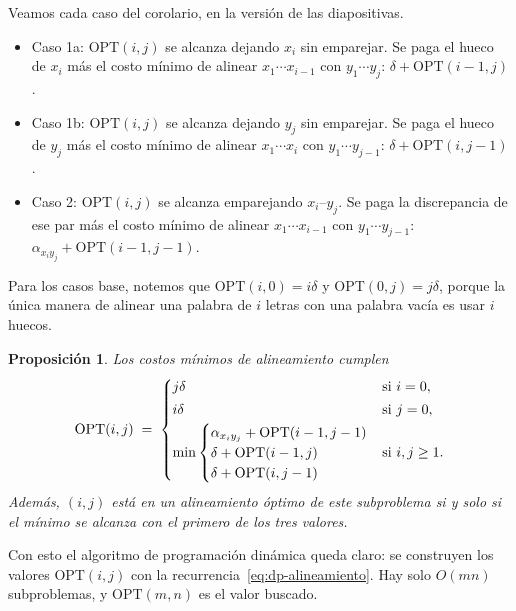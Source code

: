 \documentclass[12pt, spanish, oneside, openany]{book}
\theoremstyle{uprightplain}
\newtheorem{proposicion}[teorema]{Proposición}
\theoremstyle{definition}
\theoremstyle{remark}
\theoremstyle{definition}
\newcommand{\OPT}{\mathrm{OPT}} %
\begin{document}
Veamos cada caso del corolario, en la versión de las diapositivas.
\begin{itemize}
    \item Caso 1a: $\OPT(i,j)$ se alcanza dejando $x_i$ sin emparejar. Se paga el hueco de $x_i$ más el costo mínimo de alinear $x_1\cdots x_{i-1}$ con $y_1\cdots y_j$: $\delta+\OPT(i-1,j)$.
    \item Caso 1b: $\OPT(i,j)$ se alcanza dejando $y_j$ sin emparejar. Se paga el hueco de $y_j$ más el costo mínimo de alinear $x_1\cdots x_i$ con $y_1\cdots y_{j-1}$: $\delta+\OPT(i,j-1)$.
    \item Caso 2: $\OPT(i,j)$ se alcanza emparejando $x_i$--$y_j$. Se paga la discrepancia de ese par más el costo mínimo de alinear $x_1\cdots x_{i-1}$ con $y_1\cdots y_{j-1}$: $\alpha_{x_iy_j}+\OPT(i-1,j-1)$.
\end{itemize}
Para los casos base, notemos que $\OPT(i,0)=i\delta$ y $\OPT(0,j)=j\delta$, porque la única manera de alinear una palabra de $i$ letras con una palabra vacía es usar $i$ huecos.

\begin{proposicion}
\label{prop:dp-alineamiento}
Los costos mínimos de alineamiento cumplen
\begin{equation}
\label{eq:dp-alineamiento}
\OPT(i,j) \;=\;
\begin{cases}
j\delta & \text{si } i=0,\\[2pt]
i\delta & \text{si } j=0,\\[2pt]
\min\left\{\begin{array}{@{}l@{}}\alpha_{x_iy_j}+\OPT(i-1,j-1)\\ \delta+\OPT(i-1,j)\\ \delta+\OPT(i,j-1)\end{array}\right. & \text{si } i,j\ge 1.
\end{cases}
\end{equation}
Además, $(i,j)$ está en un alineamiento óptimo de este subproblema si y solo si el mínimo se alcanza con el primero de los tres valores.
\end{proposicion}

Con esto el algoritmo de programación dinámica queda claro: se construyen los valores $\OPT(i,j)$ con la recurrencia~\eqref{eq:dp-alineamiento}. Hay solo $O(mn)$ subproblemas, y $\OPT(m,n)$ es el valor buscado.
\end{document}
